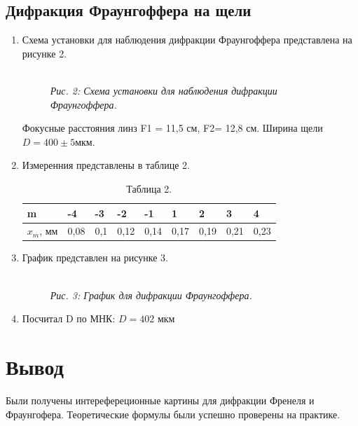 \newpage

\subsection{Дифракция Фраунгоффера на щели}

\begin{enumerate}
    \item Схема установки для наблюдения дифракции Фраунгоффера представлена на рисунке 2.

    \begin{figure}[h!]
        \\
        \textit{Рис. 2: Схема установки для наблюдения дифракции Фраунгоффера.}
    \end{figure}

    Фокусные расстояния линз F1 = 11,5 см, F2= 12,8 см. Ширина щели $D=400\pm5 $мкм.

    \item Измеренния представлены в таблице 2.

    \begin{table}[h!]
        \begin{center}
            \caption{Таблица 2.}
            \begin{tabular}{|l|l|l|l|l|l|l|l|l|}
            \hline
            m & -4 & -3 & -2 & -1 & 1 & 2 & 3 & 4 \\ \hline
            $x_m$, мм & 0,08 & 0,1 & 0,12 & 0,14 & 0,17 & 0,19 & 0,21 & 0,23 \\ \hline
            \end{tabular}
        \end{center}
        \end{table}

    \item График представлен на рисунке 3.
    
    \begin{figure}[h!]
        \\
        \textit{Рис. 3: График для дифракции Фраунгоффера.}
    \end{figure}

    \item Посчитал D по МНК: $D = 402$ мкм

\end{enumerate}

\newpage

\section{Вывод}

Были получены интерефереционные картины для дифракции Френеля и Фраунгофера.
Теоретические формулы были успешно проверены на практике.